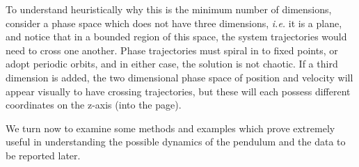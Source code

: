 \documentclass[12pt,twoside]{reedthesis}
\begin{document}
To understand heuristically why this is the minimum number of dimensions, consider a phase space which does not have three dimensions, \textit{i.e.} it is a plane, and notice that in a bounded region of this space, the system trajectories would need to cross one another.  Phase trajectories must spiral in to fixed points, or adopt periodic orbits, and in either case, the solution is not chaotic.  If a third dimension is added, the two dimensional phase space of position and velocity will appear visually to have crossing trajectories, but these will each possess different coordinates on the z-axis (into the page). 

We turn now to examine some methods and examples which prove extremely useful in understanding the possible dynamics of the pendulum and the data to be reported later.





\end{document}

